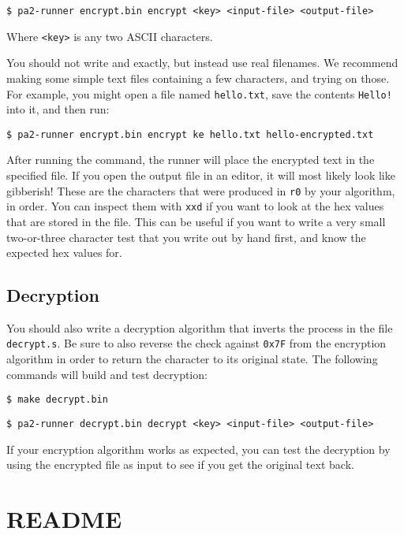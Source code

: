\documentclass{article}
\def\r#1{\texttt{r#1}}
\begin{document}
\begin{verbatim}
$ pa2-runner encrypt.bin encrypt <key> <input-file> <output-file>
\end{verbatim}

Where {\tt <key>} is any two ASCII characters.

You should not write {\tt <input-file>} and {\tt <output-file>} exactly, but
instead use real filenames. We recommend making some simple text files
containing a few characters, and trying on those. For example, you might open a
file named {\tt hello.txt}, save the contents {\tt Hello!} into it, and then
run:

\begin{verbatim}
$ pa2-runner encrypt.bin encrypt ke hello.txt hello-encrypted.txt
\end{verbatim}

After running the command, the runner will place the encrypted text in the
specified file. If you open the output file in an editor, it will most likely
look like gibberish! These are the characters that were produced in \r{0} by
your algorithm, in order. You can inspect them with {\tt xxd} if you want to
look at the hex values that are stored in the file. This can be useful if you
want to write a very small two-or-three character test that you write out by
hand first, and know the expected hex values for.

\subsection{Decryption}

You should also write a decryption algorithm that inverts the process in the
file \texttt{decrypt.s}. Be sure to also reverse the check against {\tt 0x7F} 
from the encryption algorithm in order to return the character to its original
state. The following commands will build and test decryption:

\begin{verbatim}
$ make decrypt.bin
\end{verbatim}

\begin{verbatim}
$ pa2-runner decrypt.bin decrypt <key> <input-file> <output-file>
\end{verbatim}

If your encryption algorithm works as expected, you can test the decryption by
using the encrypted file as input to see if you get the original text back.

\section{README}
\end{document}
